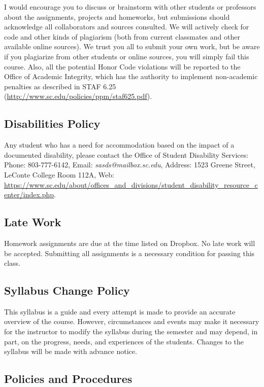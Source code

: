 \documentclass[11pt]{article}
\begin{document}
I would encourage you to discuss or brainstorm with other students or professors about the assignments, projects and homeworks, but submissions should acknowledge all collaborators and sources consulted. We will actively check for code and other kinds of plagiarism (both from current classmates and other available online sources). We trust you all to submit your own work, but be aware if you plagiarize from other students or online sources, you will simply fail this course. Also, all the potential Honor Code violations will be reported to the Office of Academic Integrity, which has the authority to implement non-academic penalties as described in STAF 6.25 (\url{http://www.sc.edu/policies/ppm/staf625.pdf}).

\subsection*{Disabilities Policy}

Any student who has a need for accommodation based on the impact of
a documented disability, please contact the Office of Student Disability Services: Phone: 803-777-6142, Email: \textit{sasds@mailbox.sc.edu}, Address: 1523 Greene Street, LeConte College Room 112A, Web: \url{https://www.sc.edu/about/offices_and_divisions/student_disability_resource_center/index.php}.

\subsection*{Late Work}

Homework assignments are due at the time listed on Dropbox.  No late work will be accepted. Submitting all assignments is a necessary condition for passing this class.

\subsection*{Syllabus Change Policy}

This syllabus is a guide and every attempt is made to provide an accurate overview of the course. However, circumstances and events may make it necessary for the instructor to modify the syllabus during the semester and may depend, in part, on the progress, needs, and experiences of the students. Changes to the syllabus will be made with advance notice.

\subsection*{Policies and Procedures}
\end{document}
